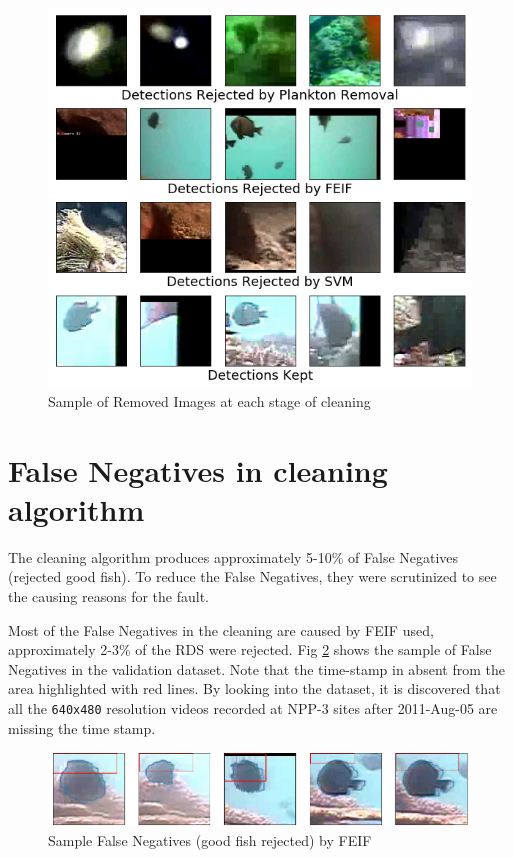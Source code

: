 \documentclass[bsc,frontabs,twoside,fullspacing,parskip,deptreport]{infthesis}
\begin{document}
\begin{figure}[h]
    \centering
    \includegraphics[scale=0.45]{graph/finalsample.png}
    \caption{Sample of Removed Images at each stage of cleaning}
    \label{fig:samplestage}
\end{figure}

\section{False Negatives in cleaning algorithm}
\label{sec:falsenegative}
\label{sec:feiffault}
\label{sec:svmfault}

The cleaning algorithm produces approximately 5-10\% of False Negatives (rejected good fish). 
To reduce the False Negatives, they were scrutinized to see the causing reasons for the fault.

Most of the False Negatives in the cleaning are caused by FEIF used, approximately 2-3\% of the RDS were rejected. 
Fig \ref{fig:feiffail} shows the sample of False Negatives in the validation dataset.
Note that the time-stamp in absent from the area highlighted with red lines.
By looking into the dataset, it is discovered that all the {\tt 640x480} resolution videos recorded at NPP-3 sites after 2011-Aug-05 are missing the time stamp.

\begin{figure}[ht]
    \centering
    \includegraphics[scale=0.40]{graph/FEIFfail.png}
    \caption{Sample False Negatives (good fish rejected) by FEIF}
    \label{fig:feiffail}
\end{figure}
\end{document}
